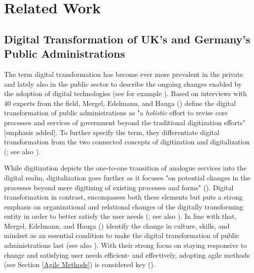 \section{Related Work}
\subsection{Digital Transformation of UK's and Germany's Public Administrations}
The term digital transformation has become ever more prevalent in the private and lately also in the public sector to describe the ongoing changes enabled by the adoption of digital technologies (see for example \cite{McKinsey2018,BehordenSpiegel2020,Tabrizi2019}). Based on interviews with 40 experts from the field, Mergel, Edelmann, and Hauga (\cite*[p. 12]{Mergel2019a}) define the digital transformation of public administrations as "a \textit{holistic} effort to revise core processes and services of government beyond the traditional digitization efforts" [emphasis added]. To further specify the term, they differentiate digital transformation from the two connected concepts of digitization and digitalization (\cite{Mergel2019a}; see also \cite{Bloomberg2018, Brennen2015}).\par 
While digitization depicts the one-to-one transition of analogue services into the digital realm, digitalization goes further as it focuses "on potential changes in the processes beyond mere digitizing of existing processes and forms" (\cite[p. 12]{Mergel2019a}). Digital transformation in contrast, encompasses both these elements but puts a strong emphasis on organizational and relational changes of the digitally transforming entity in order to better satisfy the user needs (\cite{Mergel2019a}; see also \cite{Vial2019, Henriette2015}). In line with that, Mergel, Edelmann, and Hauga (\cite*{Mergel2019a}) identify the change in culture, skills, and mindset as an essential condition to make the digital transformation of public administrations last (see also \cite{Dierks2020, Parcell2013}). With their strong focus on staying responsive to change and satisfying user needs efficient- and effectively, adopting agile methods (see Section \ref{Agile Methods}) is considered key (\cite{Mergel2018,Beyer2010, Mergel2019, osmundsen2020, Andriole2018}).\par 
